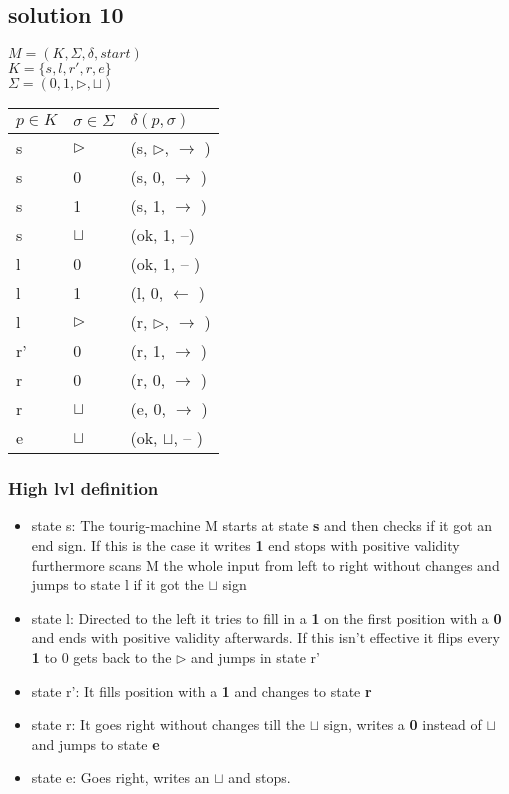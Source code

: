 \subsection{solution 10}

$M=(K,\Sigma, \delta, start)$\\
$K=\{s, l, r', r, e\}$\\
$\Sigma=(0,1,\triangleright, \sqcup)$

\begin{center}
\begin{tabular}[t]{| l | l | l |}
\hline
$p \in K$ & $\sigma \in \Sigma $ & $ \delta ( p, \sigma ) $ \\ \hline
s & $\triangleright$ & (s, $\triangleright$, $\rightarrow$ )\\ 
s & 0 & (s, 0, $\rightarrow$ )\\ 
s & 1 & (s, 1, $\rightarrow$ )\\ 
s & $\sqcup$ & (ok, 1, --)\\ \hline
l & 0 & (ok, 1, -- )\\ 
l & 1 & (l, 0, $\leftarrow$ )\\ 
l & $\triangleright$ & (r, $\triangleright$, $\rightarrow$ )\\ \hline
r' & 0 & (r, 1, $\rightarrow$ )\\ \hline
r & 0 & (r, 0, $\rightarrow$ )\\ 
r & $\sqcup$ & (e, 0, $\rightarrow$ )\\ \hline
e & $\sqcup$ & (ok, $\sqcup$, -- )\\ \hline
\end{tabular} 
\end{center}

\subsubsection{High lvl definition}
\begin{itemize}
\item state s:
The tourig-machine M starts at state \textbf{s} and then checks if it got an end sign.
If this is the case it writes \textbf{1} end stops with positive validity 
furthermore scans M the whole input from left to right without changes and jumps to state
l if it got the $\sqcup$ sign
\item state l:
Directed to the left it tries to fill in a \textbf{1} on the first position with a \textbf{0}
and ends with positive validity afterwards.
If this isn't effective it flips every \textbf{1} to 0 
gets back to the $\triangleright$ and jumps in state r'
\item state r':
It fills position with a \textbf{1} and changes to state \textbf{r}
\item state r: 
It goes right without changes till the $\sqcup$ sign, writes a \textbf{0} 
instead of $\sqcup$ and jumps to state \textbf{e}
\item state e:
Goes right, writes an $\sqcup$ and stops.

\end{itemize}
